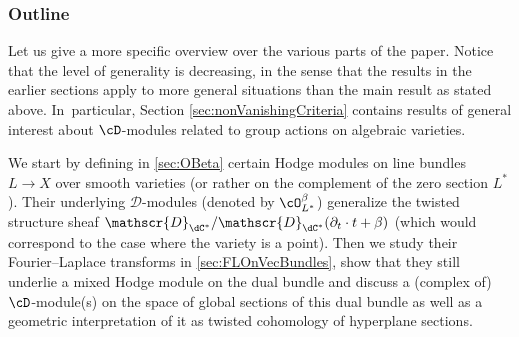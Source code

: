 \subsubsection*{Outline}
Let us give a more specific overview over the various parts of the paper. Notice that the level of generality is decreasing, in the sense that the results in the earlier sections apply to more general situations than the main result as stated above. In~particular, Section \ref{sec:nonVanishingCriteria}
contains results of general interest about
$\cD$\nobreakdash-mod\-ules related to group actions on algebraic varieties.

We start by defining in \cref{sec:OBeta} certain Hodge modules on
line bundles \hbox{$L\!\to\! X$} over smooth varieties
(or rather on the complement of the zero section $L^*$). Their underlying $\mathscr{D}$\nobreakdash-mod\-ules (denoted by $\cO_{L^*}^\beta$) generalize the twisted structure sheaf \hbox{$\mathscr{D}_{\dC^*}/\mathscr{D}_{\dC^*}(\partial_t\cdot t + \beta)$}
(which would correspond to the case where the variety is a point).
Then we study their Fourier--Laplace transforms in \cref{sec:FLOnVecBundles}, show that they still underlie a mixed Hodge module on the dual bundle and discuss a (complex of) $\cD$\nobreakdash-mod\-ule(s) on the space of global sections of this dual bundle as well as a geometric interpretation of it as twisted cohomology of hyperplane sections.

